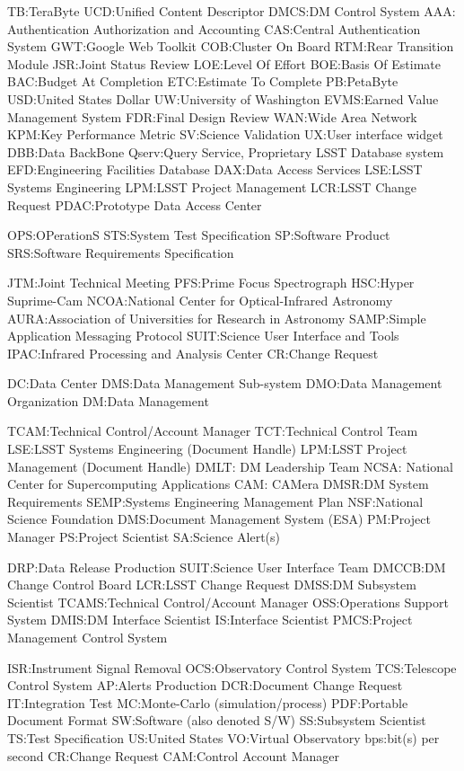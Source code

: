TB:TeraByte
UCD:Unified Content Descriptor
DMCS:DM Control System
AAA: Authentication Authorization and Accounting
CAS:Central Authentication System
GWT:Google Web Toolkit
COB:Cluster On Board
RTM:Rear Transition Module
JSR:Joint Status Review
LOE:Level Of Effort
BOE:Basis Of Estimate
BAC:Budget At Completion
ETC:Estimate To Complete
PB:PetaByte
USD:United States Dollar
UW:University of Washington
EVMS:Earned Value Management System
FDR:Final Design Review
WAN:Wide Area Network
KPM:Key Performance Metric
SV:Science Validation
UX:User interface widget
DBB:Data BackBone
Qserv:Query Service, Proprietary LSST Database system
EFD:Engineering Facilities Database
DAX:Data Access Services
LSE:LSST Systems Engineering
LPM:LSST Project Management
LCR:LSST Change Request
PDAC:Prototype Data Access Center

OPS:OPerationS
STS:System Test Specification
SP:Software Product
SRS:Software Requirements Specification

JTM:Joint Technical Meeting
PFS:Prime Focus Spectrograph
HSC:Hyper Suprime-Cam
NCOA:National Center for Optical-Infrared Astronomy
AURA:Association of Universities for Research in Astronomy
SAMP:Simple Application Messaging Protocol
SUIT:Science User Interface and Tools
IPAC:Infrared Processing and Analysis Center
CR:Change Request

DC:Data Center
DMS:Data Management Sub-system
DMO:Data Management Organization
DM:Data Management

TCAM:Technical Control/Account Manager
TCT:Technical Control Team
LSE:LSST Systems Engineering (Document Handle)
LPM:LSST Project Management (Document Handle)
DMLT: DM Leadership Team
NCSA: National Center for Supercomputing Applications
CAM: CAMera
DMSR:DM System Requirements
SEMP:Systems Engineering Management Plan
NSF:National Science Foundation
DMS:Document Management System (ESA)
PM:Project Manager
PS:Project Scientist
SA:Science Alert(s)

DRP:Data Release Production
SUIT:Science User Interface Team
DMCCB:DM Change Control Board
LCR:LSST Change Request
DMSS:DM Subsystem Scientist
TCAMS:Technical Control/Account Manager
OSS:Operations Support System
DMIS:DM Interface Scientist
IS:Interface Scientist
PMCS:Project Management Control System

ISR:Instrument Signal Removal
OCS:Observatory Control System
TCS:Telescope Control System
AP:Alerts Production
DCR:Document Change Request
IT:Integration Test
MC:Monte-Carlo (simulation/process)
PDF:Portable Document Format
SW:Software (also denoted S/W)
SS:Subsystem Scientist
TS:Test Specification
US:United States
VO:Virtual Observatory
bps:bit(s) per second
CR:Change Request
CAM:Control Account Manager

